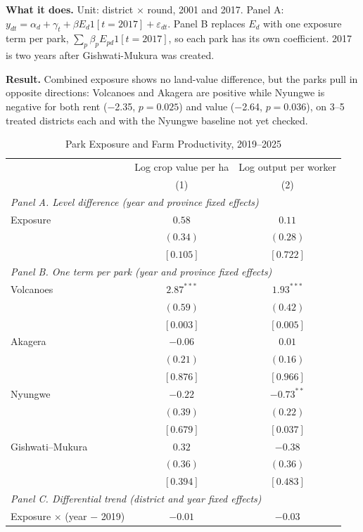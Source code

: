 \documentclass[11pt]{article}
\begin{document}
\textbf{What it does.} Unit: district $\times$ round, 2001 and 2017. Panel A: $y_{dt} = \alpha_d + \gamma_t + \beta E_d 1[t{=}2017] + \varepsilon_{dt}$. Panel B replaces $E_d$ with one exposure term per park, $\sum_p \beta_p E_{pd}1[t{=}2017]$, so each park has its own coefficient. 2017 is two years after Gishwati-Mukura was created.

\textbf{Result.} Combined exposure shows no land-value difference, but the parks pull in opposite directions: Volcanoes and Akagera are positive while Nyungwe is negative for both rent ($-$2.35, $p=0.025$) and value ($-$2.64, $p=0.036$), on 3--5 treated districts each and with the Nyungwe baseline not yet checked.
\clearpage
\begin{table}[H]
\centering\small\setlength{\tabcolsep}{4pt}
\caption{Park Exposure and Farm Productivity, 2019--2025}
\label{tab:ag_prod}
\begin{tabular}{lcc}
\toprule
 & Log crop value per ha & Log output per worker \\
 & (1) & (2) \\
\midrule
\multicolumn{3}{l}{\textit{Panel A. Level difference (year and province fixed effects)}} \\
Exposure & $0.58$ & $0.11$ \\
 & $(0.34)$ & $(0.28)$ \\
 & $[0.105]$ & $[0.722]$ \\
\multicolumn{3}{l}{\textit{Panel B. One term per park (year and province fixed effects)}} \\
Volcanoes & $2.87^{***}$ & $1.93^{***}$ \\
 & $(0.59)$ & $(0.42)$ \\
 & $[0.003]$ & $[0.005]$ \\
Akagera & $-0.06$ & $0.01$ \\
 & $(0.21)$ & $(0.16)$ \\
 & $[0.876]$ & $[0.966]$ \\
Nyungwe & $-0.22$ & $-0.73^{**}$ \\
 & $(0.39)$ & $(0.22)$ \\
 & $[0.679]$ & $[0.037]$ \\
Gishwati--Mukura & $0.32$ & $-0.38$ \\
 & $(0.36)$ & $(0.36)$ \\
 & $[0.394]$ & $[0.483]$ \\
\multicolumn{3}{l}{\textit{Panel C. Differential trend (district and year fixed effects)}} \\
Exposure $\times$ (year $-$ 2019) & $-0.01$ & $-0.03$ \\

\end{tabular}
\end{table}
\end{document}
